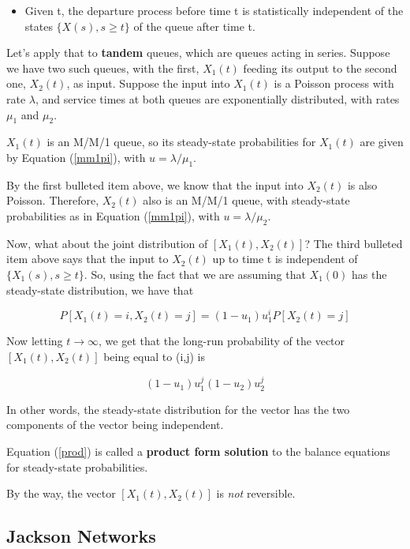 \begin{itemize}

\item Given t, the departure process before time t is statistically
independent of the states $\{ X(s), s \geq t \}$ of the queue after time
t.

\end{itemize}

Let's apply that to {\bf tandem} queues, which are queues acting in
series.  Suppose we have two such queues, with the first, $X_1(t)$
feeding its output to the second one, $X_2(t)$, as input.  Suppose the
input into $X_1(t)$ is a Poisson process with rate $\lambda$, and
service times at both queues are exponentially distributed, with rates
$\mu_1$ and $\mu_2$.

$X_1(t)$ is an M/M/1 queue, so its steady-state probabilities for
$X_1(t)$ are given by Equation (\ref{mm1pi}), with $u = \lambda/\mu_1$.

By the first bulleted item above, we know that the input into $X_2(t)$
is also Poisson.  Therefore, $X_2(t)$ also is an M/M/1 queue, with
steady-state probabilities as in Equation (\ref{mm1pi}), with $u =
\lambda/\mu_2$.

Now, what about the joint distribution of $[X_1(t),X_2(t)]$?  The third
bulleted item above says that the input to $X_2(t)$ up to time t is
independent of $\{ X_1(s), s \geq t \}$.  So, using the fact that we are
assuming that $X_1(0)$ has the steady-state distribution, we have that

\begin{equation}
P[X_1(t) = i, X_2(t) = j] = (1-u_1)u_1^i P[X_2(t) = j]
\end{equation}

Now letting $t \rightarrow \infty$, we get that the long-run
probability of the vector $[X_1(t),X_2(t)]$ being equal to (i,j) is

\begin{equation}
\label{prod}
(1-u_1)u_1^j (1-u_2)u_2^j
\end{equation}

In other words, the steady-state distribution for the vector has the two
components of the vector being independent.  

Equation (\ref{prod}) is called a {\bf product form solution} to the
balance equations for steady-state probabilities. 

By the way, the vector $[X_1(t),X_2(t)]$ is {\it not} reversible.

\subsection{Jackson Networks}

